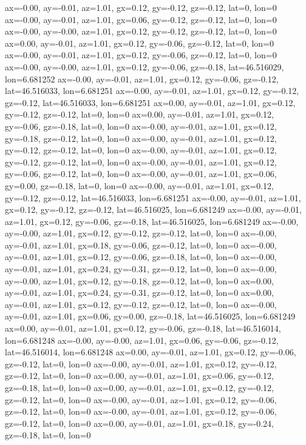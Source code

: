 ax=-0.00, ay=-0.01, az=1.01, gx=0.12, gy=-0.12, gz=-0.12, lat=0, lon=0
ax=-0.00, ay=-0.01, az=1.01, gx=0.06, gy=-0.12, gz=-0.12, lat=0, lon=0
ax=-0.00, ay=-0.00, az=1.01, gx=0.12, gy=-0.12, gz=-0.12, lat=0, lon=0
ax=0.00, ay=-0.01, az=1.01, gx=0.12, gy=-0.06, gz=-0.12, lat=0, lon=0
ax=-0.00, ay=-0.01, az=1.01, gx=0.12, gy=-0.06, gz=-0.12, lat=0, lon=0
ax=-0.00, ay=-0.00, az=1.01, gx=0.12, gy=-0.06, gz=-0.18, lat=46.516029, lon=6.681252
ax=-0.00, ay=-0.01, az=1.01, gx=0.12, gy=-0.06, gz=-0.12, lat=46.516033, lon=6.681251
ax=-0.00, ay=-0.01, az=1.01, gx=0.12, gy=-0.12, gz=-0.12, lat=46.516033, lon=6.681251
ax=0.00, ay=-0.01, az=1.01, gx=0.12, gy=-0.12, gz=-0.12, lat=0, lon=0
ax=0.00, ay=-0.01, az=1.01, gx=0.12, gy=-0.06, gz=-0.18, lat=0, lon=0
ax=-0.00, ay=-0.01, az=1.01, gx=0.12, gy=-0.18, gz=-0.12, lat=0, lon=0
ax=-0.00, ay=-0.01, az=1.01, gx=0.12, gy=-0.12, gz=-0.12, lat=0, lon=0
ax=-0.00, ay=-0.01, az=1.01, gx=0.12, gy=-0.12, gz=-0.12, lat=0, lon=0
ax=-0.00, ay=-0.01, az=1.01, gx=0.12, gy=-0.06, gz=-0.12, lat=0, lon=0
ax=-0.00, ay=-0.01, az=1.01, gx=0.06, gy=0.00, gz=-0.18, lat=0, lon=0
ax=-0.00, ay=-0.01, az=1.01, gx=0.12, gy=-0.12, gz=-0.12, lat=46.516033, lon=6.681251
ax=-0.00, ay=-0.01, az=1.01, gx=0.12, gy=-0.12, gz=-0.12, lat=46.516025, lon=6.681249
ax=-0.00, ay=-0.01, az=1.01, gx=0.12, gy=-0.06, gz=-0.18, lat=46.516025, lon=6.681249
ax=-0.00, ay=-0.00, az=1.01, gx=0.12, gy=-0.12, gz=-0.12, lat=0, lon=0
ax=-0.00, ay=-0.01, az=1.01, gx=0.18, gy=-0.06, gz=-0.12, lat=0, lon=0
ax=-0.00, ay=-0.01, az=1.01, gx=0.12, gy=-0.06, gz=-0.18, lat=0, lon=0
ax=-0.00, ay=-0.01, az=1.01, gx=0.24, gy=-0.31, gz=-0.12, lat=0, lon=0
ax=-0.00, ay=-0.00, az=1.01, gx=0.12, gy=-0.18, gz=-0.12, lat=0, lon=0
ax=0.00, ay=-0.01, az=1.01, gx=0.24, gy=-0.31, gz=-0.12, lat=0, lon=0
ax=0.00, ay=-0.01, az=1.01, gx=0.12, gy=-0.12, gz=-0.12, lat=0, lon=0
ax=-0.00, ay=-0.01, az=1.01, gx=0.06, gy=0.00, gz=-0.18, lat=46.516025, lon=6.681249
ax=0.00, ay=-0.01, az=1.01, gx=0.12, gy=-0.06, gz=-0.18, lat=46.516014, lon=6.681248
ax=-0.00, ay=-0.00, az=1.01, gx=0.06, gy=-0.06, gz=-0.12, lat=46.516014, lon=6.681248
ax=0.00, ay=-0.01, az=1.01, gx=0.12, gy=-0.06, gz=-0.12, lat=0, lon=0
ax=-0.00, ay=-0.01, az=1.01, gx=0.12, gy=-0.12, gz=-0.12, lat=0, lon=0
ax=0.00, ay=-0.01, az=1.01, gx=0.06, gy=-0.12, gz=-0.18, lat=0, lon=0
ax=0.00, ay=-0.01, az=1.01, gx=0.12, gy=-0.12, gz=-0.12, lat=0, lon=0
ax=-0.00, ay=-0.01, az=1.01, gx=0.12, gy=-0.06, gz=-0.12, lat=0, lon=0
ax=-0.00, ay=-0.01, az=1.01, gx=0.12, gy=-0.06, gz=-0.12, lat=0, lon=0
ax=0.00, ay=-0.01, az=1.01, gx=0.18, gy=-0.24, gz=-0.18, lat=0, lon=0
